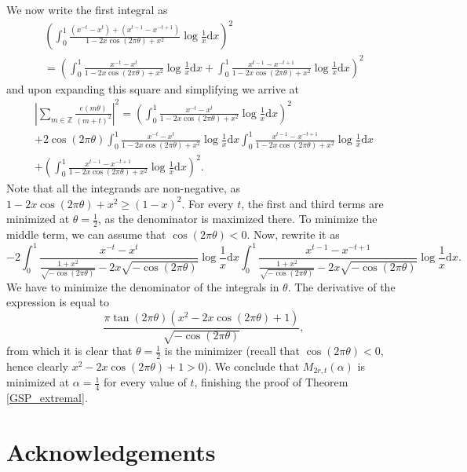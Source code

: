 \documentclass[12pt, a4paper]{amsart}
\theoremstyle{remark}
\newcommand{\ud}{\mathrm{d}}
\newcommand{\dx}{\mathrm{d}x}
\begin{document}
We now write the first integral as
\begin{multline*}
\left( \int_0^1 \frac{(x^{-t}-x^{t}) + (x^{t-1} - x^{-t+1})}{1-2x\cos(2\pi \theta) + x^2}\log\frac1 x\dx\right)^2 \\
    = 
    \left( \int_0^1 \frac{x^{-t}-x^{t}}{1-2x\cos(2\pi \theta) + x^2} \log\frac{1}{x} \ud x
    + \int_0^1\frac{x^{t-1} - x^{-t+1}}{1-2x\cos(2\pi \theta) + x^2}\log\frac1 x\dx\right)^2
\end{multline*}
and upon expanding this square and simplifying we arrive at
\begin{multline*}
    \left\lvert\sum_{m\in\mathbb Z}\frac{e( m\theta)}{(m+t)^2}\right\rvert^2
        = \left(\int_0^1 \frac{x^{-t}-x^{t}}{1-2x\cos(2\pi \theta) + x^2}\log\frac1 x\dx \right)^2\\
        + 2\cos(2\pi\theta)\int_0^1 \frac{x^{-t} - x^t}{1-2x\cos(2\pi\theta)+x^2}\log\frac1x\dx\int_0^1 \frac{x^{t-1} - x^{-t+1}}{1-2x\cos(2\pi\theta)+x^2}\log\frac1x \dx \\
        + \left(\int_0^1 \frac{x^{t-1} - x^{-t+1}}{1-2x\cos(2\pi\theta)+x^2}\log\frac1x \dx \right)^2.
\end{multline*}
Note that all the integrands are non-negative, as
$1 - 2x \cos(2\pi \theta) + x^2 \ge (1-x)^2.$ For every $t$,
the first and third
terms are minimized at $\theta = \frac{1}{2}$, as the denominator
is maximized there. To minimize the middle term, we can assume that
$\cos(2\pi\theta)<0$. Now, rewrite it as 
\begin{equation}\nonumber
    -2\int_0^1 \frac{x^{-t} - x^t}{\frac{1+x^2}{\sqrt{-\cos(2\pi\theta)}} - 2x\sqrt{-\cos(2\pi\theta)}}\log\frac1x\dx\int_0^1 \frac{x^{t-1} - x^{-t+1}}{\frac{1+x^2}{\sqrt{-\cos(2\pi\theta)}} - 2x\sqrt{-\cos(2\pi\theta)}}\log\frac1x \dx.
\end{equation}
We have to minimize the denominator of the integrals in $\theta$. The
derivative of the expression is equal to 
\begin{equation}\nonumber
\frac{\pi \tan(2 \pi \theta)(x^2 - 2 x\cos(2 \pi \theta) + 1)}{\sqrt{-\cos(2 \pi\theta)}},
\end{equation} from which it is clear that $\theta=\frac{1}{2}$ is the
minimizer (recall that $\cos(2\pi\theta)<0$, hence clearly $x^2-2x\cos(2\pi\theta)+1>0$). We
conclude that $M_{2r,t}(\alpha)$ is minimized at $\alpha = \frac{1}{4}$ for
every value of $t$, finishing the proof of Theorem \ref{GSP_extremal}.
\section*{Acknowledgements}
\end{document}
